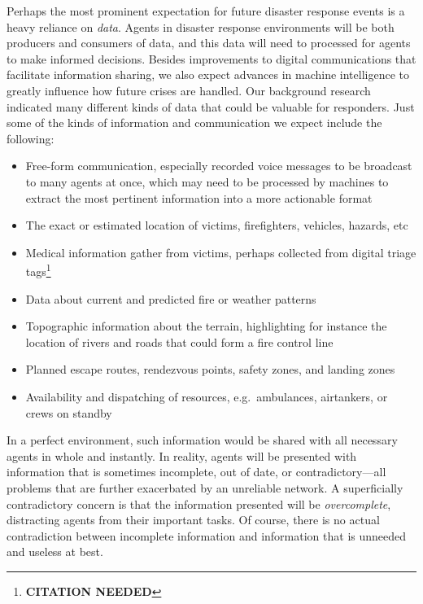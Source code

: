 \documentclass[]             %
{NASA}                       %
\theoremstyle{definition}
\newcommand{\citationneeded}{\footnote{\textbf{CITATION NEEDED}}}
\providecommand{\tightlist}{%
  \setlength{\itemsep}{0pt}\setlength{\parskip}{0pt}}
\begin{document}
Perhaps the most prominent expectation for future disaster response
events is a heavy reliance on \emph{data}. Agents in disaster response
environments will be both producers and consumers of data, and this
data will need to processed for agents to make informed decisions.
Besides improvements to digital communications that facilitate
information sharing, we also expect advances in machine intelligence
to greatly influence how future crises are handled. Our background
research indicated many different kinds of data that could be valuable
for responders. Just some of the kinds of information and
communication we expect include the following:
\begin{itemize}
  \tightlist
\item
  Free-form communication, especially recorded voice messages to be
  broadcast to many agents at once, which may need to be processed by
  machines to extract the most pertinent information into a more
  actionable format
\item
  The exact or estimated location of victims, firefighters, vehicles,
  hazards, etc
\item
  Medical information gather from victims, perhaps collected from
  digital triage tags\citationneeded
\item
  Data about current and predicted fire or weather patterns
\item
  Topographic information about the terrain, highlighting for instance
  the location of rivers and roads that could form a fire control line
\item
  Planned escape routes, rendezvous points, safety zones, and landing
  zones
\item
  Availability and dispatching of resources, e.g.~ambulances,
  airtankers, or crews on standby
\end{itemize}
In a perfect environment, such information would be shared with all
necessary agents in whole and instantly. In reality, agents will be
presented with information that is sometimes incomplete, out of date,
or contradictory---all problems that are further exacerbated by an
unreliable network. A superficially contradictory concern is that the
information presented will be \emph{overcomplete}, distracting agents
from their important tasks. Of course, there is no actual
contradiction between incomplete information and information that is
unneeded and useless at best.
\end{document}
